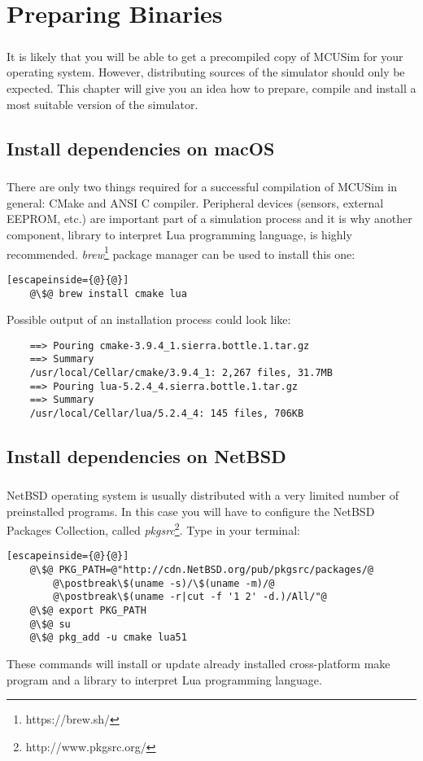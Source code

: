 \chapter{Preparing Binaries} \label{chapter:preparing-binaries}
\paragraph{}
It is likely that you will be able to get a precompiled copy of MCUSim
for your operating system. However, distributing sources of the simulator
should only be expected. This chapter will give you an idea how to prepare,
compile and install a most suitable version of the simulator.

\section{Install dependencies on macOS}
\paragraph{}
There are only two things required for a successful compilation of MCUSim
in general: CMake and ANSI C compiler. Peripheral devices (sensors,
external EEPROM, etc.) are important part of a simulation process and it is
why another component, library to interpret Lua programming language,
is highly recommended.
\emph{brew}\footnote{https://brew.sh/} package manager can be used
to install this one:
\begin{lstlisting}[escapeinside={@}{@}]
	@\$@ brew install cmake lua
\end{lstlisting}
Possible output of an installation process could look like:
\begin{lstlisting}
	==> Pouring cmake-3.9.4_1.sierra.bottle.1.tar.gz
	==> Summary
	/usr/local/Cellar/cmake/3.9.4_1: 2,267 files, 31.7MB
	==> Pouring lua-5.2.4_4.sierra.bottle.1.tar.gz
	==> Summary
	/usr/local/Cellar/lua/5.2.4_4: 145 files, 706KB
\end{lstlisting}

\section{Install dependencies on NetBSD}
\paragraph{}
NetBSD operating system is usually distributed with a very limited number
of preinstalled programs. In this case you will have to configure
the NetBSD Packages Collection, called
\emph{pkgsrc}\footnote{http://www.pkgsrc.org/}. Type in your terminal:
\begin{lstlisting}[escapeinside={@}{@}]
	@\$@ PKG_PATH=@"http://cdn.NetBSD.org/pub/pkgsrc/packages/@
		@\postbreak\$(uname -s)/\$(uname -m)/@
		@\postbreak\$(uname -r|cut -f '1 2' -d.)/All/"@
	@\$@ export PKG_PATH
	@\$@ su
	@\$@ pkg_add -u cmake lua51
\end{lstlisting}
These commands will install or update already installed cross-platform make
program and a library to interpret Lua programming language.


